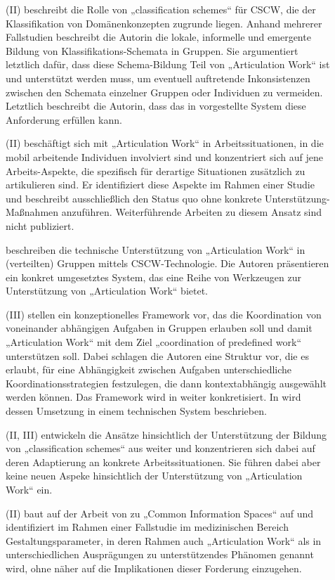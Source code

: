 \begin{description}
	\item[\citet{Simone00}] (II) beschreibt die Rolle von „classification schemes“ für \gls{CSCW}, die der Klassifikation von Domänenkonzepten zugrunde liegen. Anhand mehrerer Fallstudien beschreibt die Autorin die lokale, informelle und emergente Bildung von Klassifikations-Schemata in Gruppen. Sie argumentiert letztlich dafür, dass diese Schema-Bildung Teil von „Articulation Work“ ist und unterstützt werden muss, um eventuell auftretende Inkonsistenzen zwischen den Schemata einzelner Gruppen oder Individuen zu vermeiden. Letztlich beschreibt die Autorin, dass das in \citep{Simone99} vorgestellte System diese Anforderung erfüllen kann. 
	\item[\citet{Christensen01}] (II) beschäftigt sich mit „Articulation Work“ in Arbeitssituationen, in die mobil arbeitende Individuen involviert sind und konzentriert sich auf jene Arbeits-Aspekte, die spezifisch für derartige Situationen zusätzlich zu artikulieren sind. Er identifiziert diese Aspekte im Rahmen einer Studie und beschreibt ausschließlich den Status quo ohne konkrete Unterstützung-Maßnahmen anzuführen. Weiterführende Arbeiten zu diesem Ansatz sind nicht publiziert.
	\item[\citet{Fuchs01}] beschreiben die technische Unterstützung von „Articulation Work“ in (verteilten) Gruppen mittels \gls{CSCW}-Technologie. Die Autoren präsentieren ein konkret umgesetztes System, das eine Reihe von Werkzeugen zur Unterstützung von „Articulation Work“ bietet.
	\item[\citet{Raposo01}] (III) stellen ein konzeptionelles Framework vor, das die Koordination von voneinander abhängigen Aufgaben in Gruppen erlauben soll und damit „Articulation Work“ mit dem Ziel „coordination of predefined work“ unterstützen soll. Dabei schlagen die Autoren eine Struktur vor, die es erlaubt, für eine Abhängigkeit zwischen Aufgaben unterschiedliche Koordinationsstrategien festzulegen, die dann kontextabhängig ausgewählt werden können. Das Framework wird in \citep{Raposo02} weiter konkretisiert. In \citep{Raposo02} wird dessen Umsetzung in einem technischen System beschrieben.
	\item[\citet{Simone01}] (II, III) entwickeln die Ansätze hinsichtlich der Unterstützung der Bildung von „classification schemes“ aus \citep{Simone00} weiter und konzentrieren sich dabei auf deren Adaptierung an konkrete Arbeitssituationen. Sie führen dabei aber keine neuen Aspeke hinsichtlich der Unterstützung von „Articulation Work“ ein.
	\item[\citet{Bossen02}] (II) baut auf der Arbeit von \citep{Bannon97} zu „Common Information Spaces“ auf und identifiziert im Rahmen einer Fallstudie im medizinischen Bereich Gestaltungsparameter, in deren Rahmen auch „Articulation Work“ als in unterschiedlichen Ausprägungen zu unterstützendes Phänomen genannt wird, ohne näher auf die Implikationen dieser Forderung einzugehen.

\end{description}
